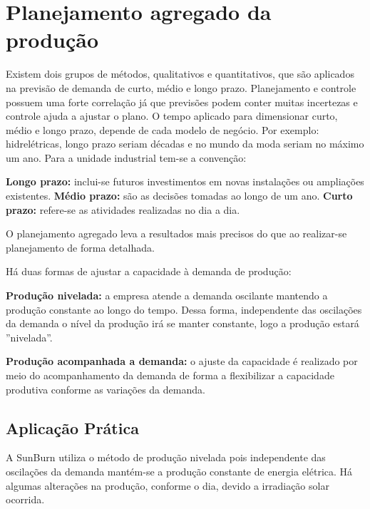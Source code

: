 \chapter{Planejamento agregado da produção} 
\label{chap:planejamento_agregado} 

Existem dois grupos de métodos, qualitativos e quantitativos, que são aplicados na previsão de demanda de curto, médio e longo prazo.
Planejamento e controle possuem uma forte correlação já que previsões podem conter muitas incertezas e controle ajuda a ajustar o plano.
O tempo aplicado para dimensionar curto, médio e longo prazo, depende de cada modelo de negócio. Por exemplo: hidrelétricas, longo prazo seriam décadas e no mundo da moda seriam no máximo um ano.
Para a unidade industrial tem-se a convenção:

\textbf{Longo prazo:} inclui-se futuros investimentos em novas instalações ou ampliações existentes.
\textbf{Médio prazo:} são as decisões tomadas ao longo de um ano.
\textbf{Curto prazo:} refere-se as atividades realizadas no dia a dia.

O planejamento agregado leva a resultados mais precisos do que ao realizar-se planejamento de forma detalhada.

Há duas formas de ajustar a capacidade à demanda de produção:

\textbf{Produção nivelada:} a empresa atende a demanda oscilante mantendo a produção constante ao longo do tempo. Dessa forma, independente das oscilações da demanda o nível da produção irá se manter constante, logo a produção estará ''nivelada''. 

\textbf{Produção acompanhada a demanda:} o ajuste da capacidade é realizado por meio do acompanhamento da demanda de forma a flexibilizar a capacidade produtiva conforme as variações da demanda.


\section{Aplicação Prática} 
\label{sec:planejamento_agregado_aplicacao}

A SunBurn utiliza o método de produção nivelada pois independente das oscilações da demanda mantém-se a produção constante de energia elétrica. Há algumas alterações na produção, conforme o dia, devido a irradiação solar ocorrida.
